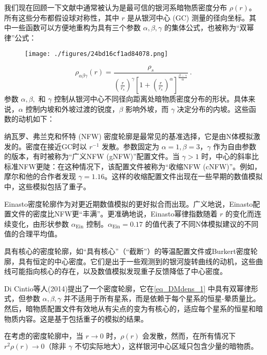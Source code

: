 
 
我们现在回顾一下文献中通常被认为是最可信的银河系暗物质密度分布 \(\rho(r)\)。所有这些分布都假设球对称性，其中 \(r\) 是从银河中心 (GC) 测量的径向坐标。其中一些函数可以方便地重构为具有三个参数 \(\alpha, \beta, \gamma\) 的集体公式，也被称为“双幂律”公式：

\begin{figure}[ht]
\centering
\texttt{[image: ./figures/24bd16cf1ad84078.png]}
\caption{} \label{fig_DMdens_1}
\end{figure}
\begin{equation}\label{eq_DMdens_1}
\rho_{\alpha\beta\gamma}(r) =  \frac{\rho_s}{ \left(\frac{r}{r_s}\right)^\gamma \left[1 + \left(\frac{r}{r_s}\right)^\alpha\right]^{\frac{\beta-\gamma}{\alpha}}  } ~.
\end{equation}
参数 \(\alpha, \beta,\) 和 \(\gamma\) 控制从银河中心不同径向距离处暗物质密度分布的形状。具体来说，\(\alpha\) 控制内坡和外坡过渡的锐度，\(\beta\) 影响外坡，而 \(\gamma\) 决定分布的内坡。这些函数的动机如下：

纳瓦罗、弗兰克和怀特 (NFW) 密度轮廓是最常见的基准选择，它是由N体模拟激发的。密度在接近GC时以 \(r^{-1}\) 发散。参数固定为 \(\alpha = 1, \beta = 3\)，\(\gamma\) 作为自由参数的版本，有时被称为“广义NFW (gNFW)”配置文件。当 \(\gamma > 1\) 时，中心的斜率比标准NFW更陡：在这种情况下，该配置文件被称为“收缩NFW (cNFW)”。例如，摩尔和他的合作者发现 \(\gamma = 1.16\)。这样的收缩配置文件出现在一些早期的数值模拟中，这些模拟包括了重子。

Einasto密度轮廓作为对更近期数值模拟的更好拟合而出现。广义地说，Einasto配置文件的密度比NFW更“丰满”。更准确地说，Einasto幂律指数随着 \(r\) 的变化而连续变化，由形状参数 \(\alpha_{\text{Ein}}\) 控制。\(\alpha_{\text{Ein}} = 0.17\) 的值代表了不同N体模拟建议的不同值的合理平均值。

具有核心的密度轮廓，如“具有核心”（“截断”）的等温配置文件或Burkert密度轮廓，具有恒定的中心密度。它们是出于一些观测到的银河旋转曲线的动机，这些曲线可能指向核心的存在，以及数值模拟发现重子反馈降低了中心密度。

Di Cintio等人(2014)提出了一个密度轮廓，它在\autoref{eq_DMdens_1} 中具有双幂律形式，但参数 \(\alpha, \beta, \gamma\) 并不适用于所有星系，而是依赖于每个星系的恒星-晕质量比。然后，暗物质配置文件有效地从有尖点的变为有核心的，适应每个星系的恒星和暗物质内容。这是基于包括重子的模拟的结果。

在考虑的密度轮廓中，当 \(r \to 0\) 时，\(\rho(r)\) 会发散，然而，在所有情况下 \(r^2\rho(r) \to 0\)（除非 \(\gamma\) 不切实际地大），这样银河中心区域只包含少量的暗物质。

